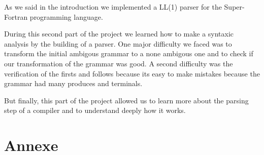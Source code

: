 \documentclass[12pt]{article}
\begin{document}
As we said in the introduction we implemented a LL(1) parser for the Super-Fortran programming language.

During this second part of the project we learned how to make a syntaxic analysis by
the building of a parser.
One major difficulty we faced was to transform the initial ambigous grammar to a none ambigous one
and to check if our transformation of the grammar was good.
A second difficulty was the verification of the firsts and follows because its easy to make mistakes
because the grammar had many produces and terminals.

But finally, this part of the project allowed us to learn more about the parsing step of a compiler 
and to understand deeply how it works.

\section{Annexe}
\end{document}
